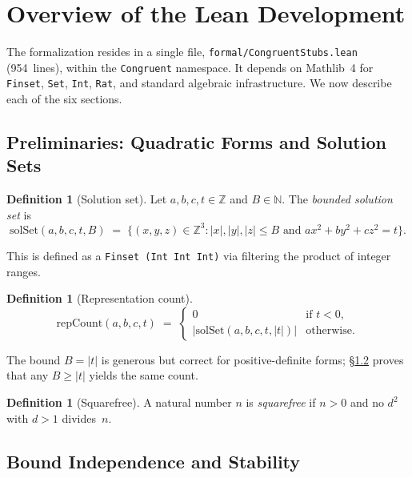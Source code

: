 \documentclass[11pt,a4paper]{article}
\theoremstyle{definition}
\newtheorem{definition}[theorem]{Definition}
\newcommand{\Z}{\mathbb{Z}}
\newcommand{\N}{\mathbb{N}}
\newcommand{\lean}[1]{\texttt{#1}}
\newcommand{\solSet}{\mathrm{solSet}}
\newcommand{\repCount}{\mathrm{repCount}}
\begin{document}
\section{Overview of the Lean Development}\label{sec:lean}

The formalization resides in a single file,
\texttt{formal/CongruentStubs.lean} (954~lines), within the
\lean{Congruent} namespace.  It depends on Mathlib~4 for
\lean{Finset}, \lean{Set}, \lean{Int}, \lean{Rat}, and standard
algebraic infrastructure.  We now describe each of the six sections.

\subsection{Preliminaries: Quadratic Forms and Solution Sets}\label{sec:s1}

\begin{definition}[Solution set]\label{def:solset}
Let $a, b, c, t \in \Z$ and $B \in \N$.  The \emph{bounded solution
set} is
\[
  \solSet(a,b,c,t,B) \;=\;
  \bigl\{(x,y,z) \in \Z^3 : |x|,|y|,|z| \le B
    \text{ and } ax^2 + by^2 + cz^2 = t\bigr\}.
\]
\end{definition}

This is defined as a \lean{Finset (Int \texttimes{} Int \texttimes{} Int)}
via filtering the product of integer ranges.

\begin{definition}[Representation count]\label{def:repcount}
\[
  \repCount(a,b,c,t) \;=\;
  \begin{cases}
    0 & \text{if } t < 0,\\
    \bigl|\solSet(a,b,c,t,|t|)\bigr| & \text{otherwise.}
  \end{cases}
\]
\end{definition}

The bound $B = |t|$ is generous but correct for positive-definite
forms; \S\ref{sec:s2} proves that any $B \ge |t|$ yields the same
count.

\begin{definition}[Squarefree]\label{def:sqfree}
A natural number $n$ is \emph{squarefree} if $n > 0$ and no
$d^2$ with $d > 1$ divides~$n$.
\end{definition}

\subsection{Bound Independence and Stability}\label{sec:s2}
\end{document}
